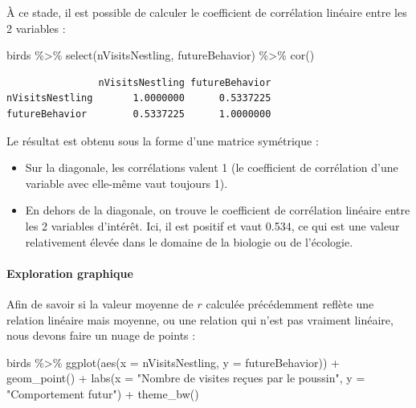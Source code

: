\documentclass[
  a4paper,
]{article}
\newenvironment{Shaded}{\begin{snugshade}}{\end{snugshade}}
\newcommand{\AttributeTok}[1]{\textcolor[rgb]{0.00,0.34,0.68}{#1}}
\newcommand{\FunctionTok}[1]{\textcolor[rgb]{0.39,0.29,0.61}{#1}}
\newcommand{\NormalTok}[1]{\textcolor[rgb]{0.12,0.11,0.11}{#1}}
\newcommand{\SpecialCharTok}[1]{\textcolor[rgb]{0.24,0.68,0.91}{#1}}
\newcommand{\StringTok}[1]{\textcolor[rgb]{0.75,0.01,0.01}{#1}}
\providecommand{\tightlist}{%
  \setlength{\itemsep}{0pt}\setlength{\parskip}{0pt}}
\begin{document}
À ce stade, il est possible de calculer le coefficient de corrélation linéaire entre les 2 variables :

\begin{Shaded}
\begin{Highlighting}[]
\NormalTok{birds }\SpecialCharTok{\%\textgreater{}\%} 
  \FunctionTok{select}\NormalTok{(nVisitsNestling, futureBehavior) }\SpecialCharTok{\%\textgreater{}\%} 
  \FunctionTok{cor}\NormalTok{()}
\end{Highlighting}
\end{Shaded}

\begin{verbatim}
                nVisitsNestling futureBehavior
nVisitsNestling       1.0000000      0.5337225
futureBehavior        0.5337225      1.0000000
\end{verbatim}

Le résultat est obtenu sous la forme d'une matrice symétrique :

\begin{itemize}
\tightlist
\item
  Sur la diagonale, les corrélations valent 1 (le coefficient de corrélation d'une variable avec elle-même vaut toujours 1).
\item
  En dehors de la diagonale, on trouve le coefficient de corrélation linéaire entre les 2 variables d'intérêt. Ici, il est positif et vaut 0.534, ce qui est une valeur relativement élevée dans le domaine de la biologie ou de l'écologie.
\end{itemize}

\hypertarget{exploration-graphique-4}{%
\paragraph{Exploration graphique}\label{exploration-graphique-4}}

Afin de savoir si la valeur moyenne de \(r\) calculée précédemment reflète une relation linéaire mais moyenne, ou une relation qui n'est pas vraiment linéaire, nous devons faire un nuage de points :

\begin{Shaded}
\begin{Highlighting}[]
\NormalTok{birds }\SpecialCharTok{\%\textgreater{}\%} 
  \FunctionTok{ggplot}\NormalTok{(}\FunctionTok{aes}\NormalTok{(}\AttributeTok{x =}\NormalTok{ nVisitsNestling, }\AttributeTok{y =}\NormalTok{ futureBehavior)) }\SpecialCharTok{+}
  \FunctionTok{geom\_point}\NormalTok{() }\SpecialCharTok{+}
  \FunctionTok{labs}\NormalTok{(}\AttributeTok{x =} \StringTok{"Nombre de visites reçues par le poussin"}\NormalTok{,}
       \AttributeTok{y =} \StringTok{"Comportement futur"}\NormalTok{) }\SpecialCharTok{+}
  \FunctionTok{theme\_bw}\NormalTok{()}
\end{Highlighting}
\end{Shaded}
\end{document}
